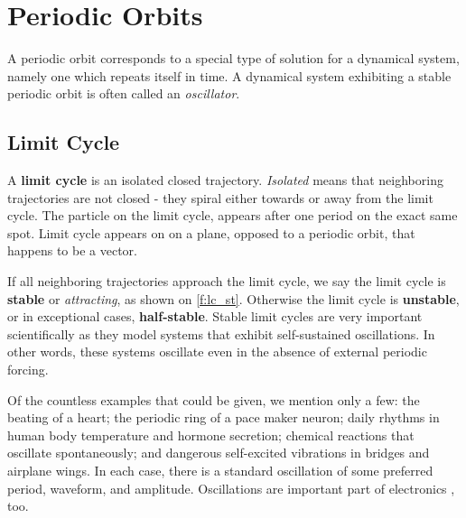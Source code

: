\documentclass[journal]{IEEEtran}
\begin{document}
\section{Periodic Orbits}
A periodic orbit corresponds to a special type of solution for a dynamical system, namely one which repeats itself in time. A dynamical system exhibiting a stable periodic orbit is often called an \textit{oscillator}. 

\subsection{Limit Cycle}
A \textbf{limit cycle} is an isolated closed trajectory. \textit{Isolated} means that neighboring trajectories are not closed - they spiral either towards or away from the limit cycle. The particle on the limit cycle, appears after one period on the exact same spot. Limit cycle appears on on a plane, opposed to a periodic orbit, that happens to be a vector.


If all neighboring trajectories approach the limit cycle, we say the limit cycle is \textbf{stable} or \textit{attracting}, as shown on \cref{f:lc_st}. Otherwise the limit cycle is \textbf{unstable}, or in exceptional cases, \textbf{half-stable}. Stable limit cycles are very important scientifically as they model systems that exhibit self-sustained oscillations. In other words, these systems oscillate even in the absence of external periodic forcing. 


Of the countless examples that could be given, we mention only a few: the beating of a heart; the periodic ring of a pace maker neuron; daily rhythms in human body temperature and hormone secretion; chemical reactions that oscillate spontaneously; and dangerous self-excited vibrations in bridges and airplane wings. In each case, there is a standard oscillation of some preferred period, waveform, and amplitude. Oscillations are important part of electronics \cite{oscillations}, too.
\end{document}
